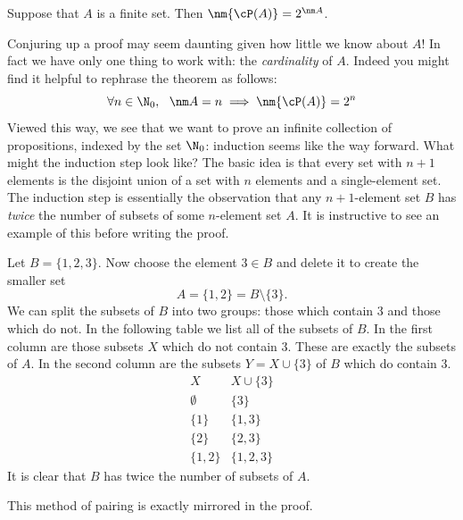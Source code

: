 \begin{thm}\label{thm:powercard}
Suppose that $A$ is a finite set. Then $\nm{\cP(A)}=2^{\nm A}$.
\end{thm}

\noindent Conjuring up a proof may seem daunting given how little we know about $A$! In fact we have only one thing to work with: the \emph{cardinality} of $A$. Indeed you might find it helpful to rephrase the theorem as follows:
\[\forall n\in\N_0,\ \ \nm A=n\implies \nm{\cP(A)}=2^{n}\]
Viewed this way, we see that we want to prove an infinite collection of propositions, indexed by the set $\N_0$:  induction seems like the way forward. What might the induction step look like? The basic idea is that every set with $n+1$ elements is the disjoint union of a set with $n$ elements and a single-element set. The induction step is essentially the observation that any $n+1$-element set $B$ has \emph{twice} the number of subsets of some $n$-element set $A$. It is instructive to see an example of this before writing the proof. 

\begin{example}
Let $B=\{1,2,3\}$. Now choose the element $3\in B$ and delete it to create the smaller set
\[A=\{1,2\}=B\setminus\{3\}.\]
We can split the subsets of $B$ into two groups: those which contain 3 and those which do not. In the following table we list all of the subsets of $B$. In the first column are those subsets $X$ which do not contain 3. These are exactly the subsets of $A$. In the second column are the subsets $Y=X\cup\{3\}$ of $B$ which do contain 3.
\[\begin{array}{c|c}
X&X\cup\{3\}\\\hline
\emptyset&\{3\}\\
\{1\}&\{1,3\}\\
\{2\}&\{2,3\}\\
\{1,2\}&\{1,2,3\}
\end{array}\]
It is clear that $B$ has twice the number of subsets of $A$.
\end{example}

\noindent This method of pairing is exactly mirrored in the proof.


